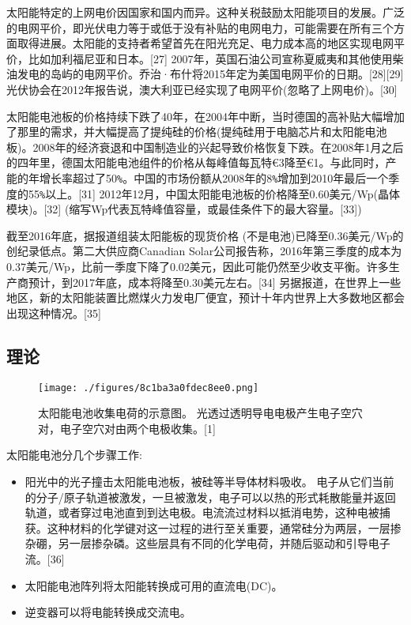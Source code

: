 太阳能特定的上网电价因国家和国内而异。这种关税鼓励太阳能项目的发展。广泛的电网平价，即光伏电力等于或低于没有补贴的电网电力，可能需要在所有三个方面取得进展。太阳能的支持者希望首先在阳光充足、电力成本高的地区实现电网平价，比如加利福尼亚和日本。[27] 2007年，英国石油公司宣称夏威夷和其他使用柴油发电的岛屿的电网平价。乔治·布什将2015年定为美国电网平价的日期。[28][29] 光伏协会在2012年报告说，澳大利亚已经实现了电网平价(忽略了上网电价)。[30]

太阳能电池板的价格持续下跌了40年，在2004年中断，当时德国的高补贴大幅增加了那里的需求，并大幅提高了提纯硅的价格(提纯硅用于电脑芯片和太阳能电池板)。2008年的经济衰退和中国制造业的兴起导致价格恢复下跌。在2008年1月之后的四年里，德国太阳能电池组件的价格从每峰值每瓦特€3降至€1。与此同时，产能的年增长率超过了50\verb`%`。中国的市场份额从2008年的8\verb`%`增加到2010年最后一个季度的55\verb`%`以上。[31] 2012年12月，中国太阳能电池板的价格降至0.60美元/Wp(晶体模块)。[32] (缩写Wp代表瓦特峰值容量，或最佳条件下的最大容量。[33])

截至2016年底，据报道组装太阳能板的现货价格 (不是电池)已降至0.36美元/Wp的创纪录低点。第二大供应商Canadian Solar公司报告称，2016年第三季度的成本为0.37美元/Wp，比前一季度下降了0.02美元，因此可能仍然至少收支平衡。许多生产商预计，到2017年底，成本将降至0.30美元左右。[34] 另据报道，在世界上一些地区，新的太阳能装置比燃煤火力发电厂便宜，预计十年内世界上大多数地区都会出现这种情况。[35]

\subsection{理论}

\begin{figure}[ht]
\centering
\texttt{[image: ./figures/8c1ba3a0fdec8ee0.png]}
\caption{太阳能电池收集电荷的示意图。 光透过透明导电电极产生电子空穴对，电子空穴对由两个电极收集。[1]} \label{fig_TYNDC_10}
\end{figure}

太阳能电池分几个步骤工作:

\begin{itemize}
\item 阳光中的光子撞击太阳能电池板，被硅等半导体材料吸收。
电子从它们当前的分子/原子轨道被激发，一旦被激发，电子可以以热的形式耗散能量并返回轨道，或者穿过电池直到到达电极。电流流过材料以抵消电势，这种电被捕获。这种材料的化学键对这一过程的进行至关重要，通常硅分为两层，一层掺杂硼，另一层掺杂磷。这些层具有不同的化学电荷，并随后驱动和引导电子流。[36]
\item 太阳能电池阵列将太阳能转换成可用的直流电(DC)。
\item 逆变器可以将电能转换成交流电。
\end{itemize}

